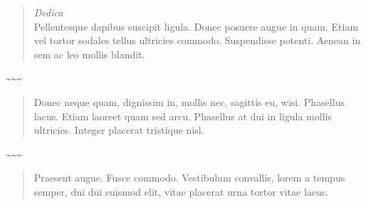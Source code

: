 \cleartorecto
\thispagestyle{empty}

\mbox{}
\vfill

\begin{quote}
\centering
\emph{Dedica}\\[0.6\baselineskip]
Pellentesque dapibus suscipit ligula. Donec posuere augue in quam. Etiam vel
tortor sodales tellus ultricies commodo. Suspendisse potenti. Aenean in sem ac
leo mollis blandit.


\end{quote}

{\centering \textasciitilde\space \textasciitilde\space \textasciitilde\par}

\begin{quote}
\centering
Donec neque quam, dignissim in, mollis nec, sagittis eu, wisi. Phasellus lacus.
Etiam laoreet quam sed arcu. Phasellus at dui in ligula mollis ultricies.
Integer placerat tristique nisl.


\end{quote}

{\centering \textasciitilde\space \textasciitilde\space \textasciitilde\par}

\begin{quote}
\centering
Praesent augue. Fusce commodo. Vestibulum convallis, lorem a tempus semper, dui
dui euismod elit, vitae placerat urna tortor vitae lacus.


\end{quote}


\vfill
\mbox{}

